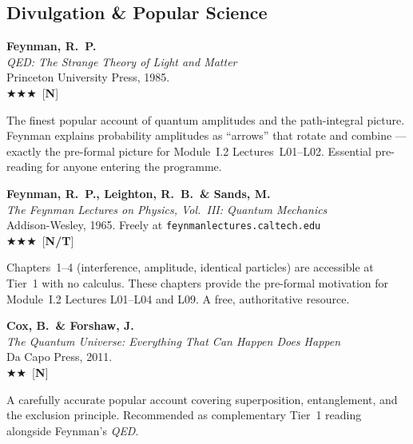 \documentclass[11pt,a4paper]{article}
\newcommand{\essential}{$\bigstar\bigstar\bigstar$}
\newcommand{\recommended}{$\bigstar\bigstar$}
\newenvironment{bibentry}[1]{\begin{tcolorbox}[entrybox=#1,top=4pt,bottom=4pt]}{\end{tcolorbox}\smallskip}
\begin{document}
\subsection{Divulgation \& Popular Science}

\begin{bibentry}{t1light}
\textbf{Feynman, R.~P.}\\
\textit{QED: The Strange Theory of Light and Matter}\\
Princeton University Press, 1985.\\[3pt]
\essential\ [\textbf{N}]\\[3pt]
\begin{tcolorbox}[annotbox]
The finest popular account of quantum amplitudes and the path-integral picture.
Feynman explains probability amplitudes as ``arrows'' that rotate and combine ---
exactly the pre-formal picture for Module~I.2 Lectures~L01--L02. Essential
pre-reading for anyone entering the programme.
\end{tcolorbox}
\end{bibentry}

\begin{bibentry}{t1light}
\textbf{Feynman, R.~P., Leighton, R.~B.\ \& Sands, M.}\\
\textit{The Feynman Lectures on Physics, Vol.~III: Quantum Mechanics}\\
Addison-Wesley, 1965. Freely at \texttt{feynmanlectures.caltech.edu}\\[3pt]
\essential\ [\textbf{N/T}]\\[3pt]
\begin{tcolorbox}[annotbox]
Chapters~1--4 (interference, amplitude, identical particles) are accessible at Tier~1
with no calculus. These chapters provide the pre-formal motivation for Module~I.2
Lectures L01--L04 and L09. A free, authoritative resource.
\end{tcolorbox}
\end{bibentry}

\begin{bibentry}{t1light}
\textbf{Cox, B.\ \& Forshaw, J.}\\
\textit{The Quantum Universe: Everything That Can Happen Does Happen}\\
Da Capo Press, 2011.\\[3pt]
\recommended\ [\textbf{N}]\\[3pt]
\begin{tcolorbox}[annotbox]
A carefully accurate popular account covering superposition, entanglement, and the
exclusion principle. Recommended as complementary Tier~1 reading alongside Feynman's
\textit{QED}.
\end{tcolorbox}
\end{bibentry}
\end{document}

